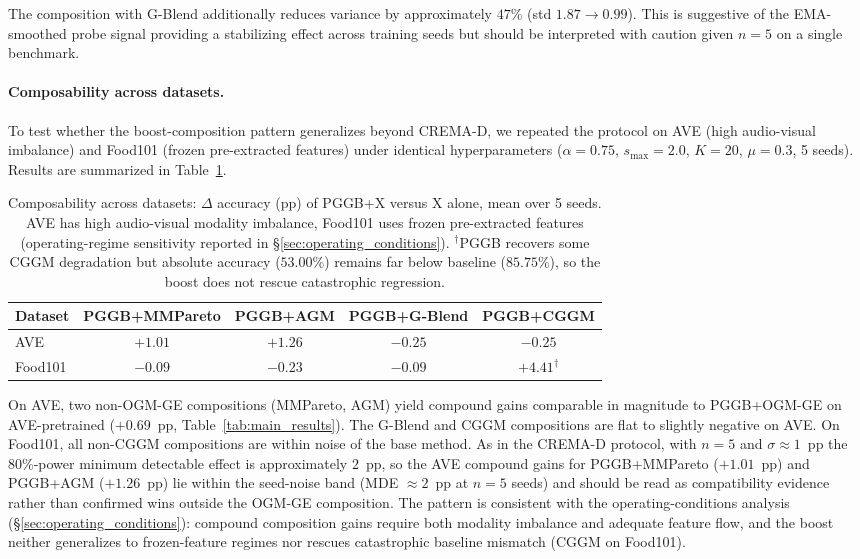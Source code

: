 \documentclass{article} %
\begin{document}
The composition with G-Blend additionally reduces variance by approximately $47\%$ (std $1.87 \to 0.99$). This is suggestive of the EMA-smoothed probe signal providing a stabilizing effect across training seeds but should be interpreted with caution given $n{=}5$ on a single benchmark.

\paragraph{Composability across datasets.} To test whether the boost-composition pattern generalizes beyond CREMA-D, we repeated the protocol on AVE (high audio-visual imbalance) and Food101 (frozen pre-extracted features) under identical hyperparameters ($\alpha{=}0.75$, $s_{\max}{=}2.0$, $K{=}20$, $\mu{=}0.3$, 5 seeds). Results are summarized in Table~\ref{tab:composability_extended}.

\begin{table}[H]
\centering
\caption{Composability across datasets: $\Delta$ accuracy (pp) of PGGB+X versus X alone, mean over 5 seeds. AVE has high audio-visual modality imbalance, Food101 uses frozen pre-extracted features (operating-regime sensitivity reported in \S\ref{sec:operating_conditions}). $^\dagger$PGGB recovers some CGGM degradation but absolute accuracy ($53.00\%$) remains far below baseline ($85.75\%$), so the boost does not rescue catastrophic regression.}
\label{tab:composability_extended}
\begin{tabular}{lcccc}
\toprule
\textbf{Dataset} & \textbf{PGGB+MMPareto} & \textbf{PGGB+AGM} & \textbf{PGGB+G-Blend} & \textbf{PGGB+CGGM} \\
\midrule
AVE     & $+1.01$ & $+1.26$ & $-0.25$ & $-0.25$ \\
Food101 & $-0.09$ & $-0.23$ & $-0.09$ & $+4.41^\dagger$ \\
\bottomrule
\end{tabular}
\end{table}

On AVE, two non-OGM-GE compositions (MMPareto, AGM) yield compound gains comparable in magnitude to PGGB+OGM-GE on AVE-pretrained ($+0.69$~pp, Table~\ref{tab:main_results}). The G-Blend and CGGM compositions are flat to slightly negative on AVE. On Food101, all non-CGGM compositions are within noise of the base method. As in the CREMA-D protocol, with $n{=}5$ and $\sigma \approx 1$~pp the 80\%-power minimum detectable effect is approximately $2$~pp, so the AVE compound gains for PGGB+MMPareto ($+1.01$~pp) and PGGB+AGM ($+1.26$~pp) lie within the seed-noise band (MDE $\approx 2$~pp at $n{=}5$ seeds) and should be read as compatibility evidence rather than confirmed wins outside the OGM-GE composition. The pattern is consistent with the operating-conditions analysis (\S\ref{sec:operating_conditions}): compound composition gains require both modality imbalance and adequate feature flow, and the boost neither generalizes to frozen-feature regimes nor rescues catastrophic baseline mismatch (CGGM on Food101).
\end{document}
